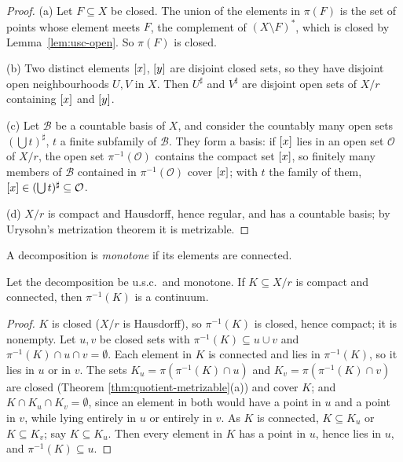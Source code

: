 \begin{proof}
(a) Let $F\subseteq X$ be closed. The union of the elements in $\pi(F)$ is the set of points whose element
meets $F$, the complement of $(X\setminus F)^*$, which is closed by Lemma~\ref{lem:usc-open}. So
$\pi(F)$ is closed.

(b) Two distinct elements $[x]$, $[y]$ are disjoint closed sets, so they have disjoint open
neighbourhoods $U,V$ in $X$. Then $U^\sharp$ and $V^\sharp$ are disjoint open sets of $X/r$ containing
$[x]$ and $[y]$.

(c) Let $\mathcal B$ be a countable basis of $X$, and consider the countably many open sets
$(\bigcup t)^\sharp$, $t$ a finite subfamily of $\mathcal B$. They form a basis: if $[x]$ lies in an
open set $\mathcal O$ of $X/r$, the open set $\pi^{-1}(\mathcal O)$ contains the compact set $[x]$, so
finitely many members of $\mathcal B$ contained in $\pi^{-1}(\mathcal O)$ cover $[x]$; with $t$ the
family of them, $[x]\in(\bigcup t)^\sharp\subseteq\mathcal O$.

(d) $X/r$ is compact and Hausdorff, hence regular, and has a countable basis; by Urysohn's
metrization theorem it is metrizable.
\end{proof}


A decomposition is \emph{monotone} if its elements are connected.

\begin{theorem}\label{thm:monotone-preimage}
Let the decomposition be u.s.c.\ and monotone. If $K\subseteq X/r$ is compact and connected, then
$\pi^{-1}(K)$ is a continuum.
\end{theorem}

\begin{proof}
$K$ is closed ($X/r$ is Hausdorff), so $\pi^{-1}(K)$ is closed, hence compact; it is nonempty. Let
$u,v$ be closed sets with $\pi^{-1}(K)\subseteq u\cup v$ and $\pi^{-1}(K)\cap u\cap v=\emptyset$. Each element
in $K$ is connected and lies in $\pi^{-1}(K)$, so it lies in $u$ or in $v$. The sets
$K_u=\pi(\pi^{-1}(K)\cap u)$ and $K_v=\pi(\pi^{-1}(K)\cap v)$ are closed (Theorem
\ref{thm:quotient-metrizable}(a)) and cover $K$; and $K\cap K_u\cap K_v=\emptyset$, since an element in
both would have a point in $u$ and a point in $v$, while lying entirely in $u$ or entirely in $v$. As
$K$ is connected, $K\subseteq K_u$ or $K\subseteq K_v$; say $K\subseteq K_u$. Then every element in $K$ has a point
in $u$, hence lies in $u$, and $\pi^{-1}(K)\subseteq u$.
\end{proof}

